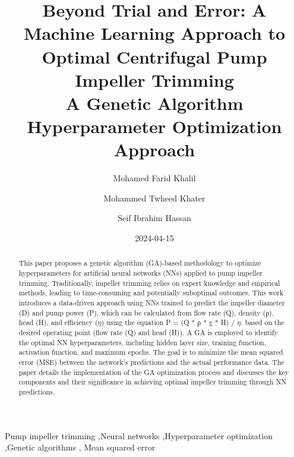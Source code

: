 \documentclass[
  super,
  review,
  3p]{elsarticle}
\date{2024-04-15}
\begin{document}
\begin{frontmatter}
\title{Beyond Trial and Error: A Machine Learning Approach to Optimal
Centrifugal Pump Impeller Trimming \\\large{A Genetic Algorithm
Hyperparameter Optimization Approach} }
\author[1]{Mohamed Farid Khalil%
%
}
\author[1]{Mohammed Twheed Khater%
%
}
\author[1]{Seif Ibrahim Hassan%
%
}



        
\begin{abstract}
This paper proposes a genetic algorithm (GA)-based methodology to
optimize hyperparameters for artificial neural networks (NNs) applied to
pump impeller trimming. Traditionally, impeller trimming relies on
expert knowledge and empirical methods, leading to time-consuming and
potentially suboptimal outcomes. This work introduces a data-driven
approach using NNs trained to predict the impeller diameter (D) and pump
power (P), which can be calculated from flow rate (Q), density (ρ), head
(H), and efficiency (\(\eta\)) using the equation P = (Q * ρ * g * H) /
\(\eta\). based on the desired operating point (flow rate (Q) and head
(H)). A GA is employed to identify the optimal NN hyperparameters,
including hidden layer size, training function, activation function, and
maximum epochs. The goal is to minimize the mean squared error (MSE)
between the network's predictions and the actual performance data. The
paper details the implementation of the GA optimization process and
discusses the key components and their significance in achieving optimal
impeller trimming through NN predictions.
\end{abstract}





\begin{keyword}
    Pump impeller trimming \sep Neural networks \sep Hyperparameter
optimization \sep Genetic algorithms \sep 
    Mean squared error
\end{keyword}
\end{frontmatter}
    
\end{document}
